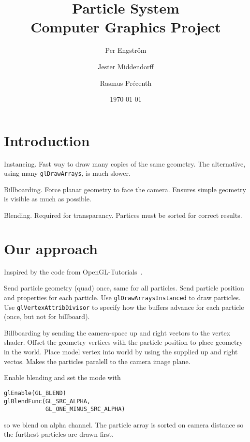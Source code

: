 \documentclass[a4paper, twocolumn, DIV=15]{scrartcl}
\title{\LARGE Particle System \\
    \normalfont \Large Computer Graphics Project}
\author{Per Engström \and Jester Middendorff \and Rasmus Précenth}
\date{\today}
\begin{document}
\maketitle

\thispagestyle{empty}

\section{Introduction}
\label{sec:introduction}

Instancing. Fast way to draw many copies of the same geometry. The alternative, using many \texttt{glDrawArrays}, is much slower.

Billboarding. Force planar geometry to face the camera. Ensures simple geometry is visible as much as possible.

Blending. Required for transparancy. Partices must be sorted for correct results.

\section{Our approach}
\label{sec:our_approach}

Inspired by the code from OpenGL-Tutorials~\cite{opengl-tutorial}.

Send particle geometry (quad) once, same for all particles. Send particle position and properties for each particle. Use \texttt{glDrawArraysInstanced} to draw particles. Use \texttt{glVertexAttribDivisor} to specify how the buffers advance for each particle (once, but not for billboard).

Billboarding by sending the camera-space up and right vectors to the vertex shader. Offset the geometry vertices with the particle position to place geometry in the world. Place model vertex into world by using the supplied up and right vectos. Makes the particles paralell to the camera image plane.

Enable blending and set the mode with
\begin{verbatim}
glEnable(GL_BLEND)
glBlendFunc(GL_SRC_ALPHA,
            GL_ONE_MINUS_SRC_ALPHA)
\end{verbatim}
so we blend on alpha channel. The particle array is sorted on camera distance so the furthest particles are drawn first.

\printbibliography
\end{document}
